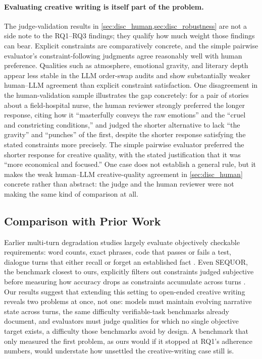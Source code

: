 \paragraph{Evaluating creative writing is itself part of the problem.} The judge-validation results in \cref{sec:disc_human,sec:disc_robustness} are not a side note to the RQ1--RQ3 findings; they qualify how much weight those findings can bear. Explicit constraints are comparatively concrete, and the simple pairwise evaluator's constraint-following judgments agree reasonably well with human preference. Qualities such as atmosphere, emotional gravity, and literary depth appear less stable in the LLM order-swap audits and show substantially weaker human--LLM agreement than explicit constraint satisfaction. One disagreement in the human-validation sample illustrates the gap concretely: for a pair of stories about a field-hospital nurse, the human reviewer strongly preferred the longer response, citing how it ``masterfully conveys the raw emotions'' and the ``cruel and constricting conditions,'' and judged the shorter alternative to lack ``the gravity'' and ``punches'' of the first, despite the shorter response satisfying the stated constraints more precisely. The simple pairwise evaluator preferred the shorter response for creative quality, with the stated justification that it was ``more economical and focused.'' One case does not establish a general rule, but it makes the weak human--LLM creative-quality agreement in \cref{sec:disc_human} concrete rather than abstract: the judge and the human reviewer were not making the same kind of comparison at all.

\subsection{Comparison with Prior Work}
\label{sec:disc_prior_work}

Earlier multi-turn degradation studies largely evaluate objectively checkable requirements: word counts, exact phrases, code that passes or fails a test, dialogue turns that either recall or forget an established fact \citep{laban2025llmslostmultiturnconversation,he2024multiifbenchmarkingllmsmultiturn,jia2026battleanotherprobingllms,li2025structflowbenchstructuredflowbenchmark}. Even SEQUOR, the benchmark closest to ours, explicitly filters out constraints judged subjective before measuring how accuracy drops as constraints accumulate across turns \citep{canaverde2026sequormultiturnbenchmarkrealistic}. Our results suggest that extending this setting to open-ended creative writing reveals two problems at once, not one: models must maintain evolving narrative state across turns, the same difficulty verifiable-task benchmarks already document, and evaluators must judge qualities for which no single objective target exists, a difficulty those benchmarks avoid by design. A benchmark that only measured the first problem, as ours would if it stopped at RQ1's adherence numbers, would understate how unsettled the creative-writing case still is.
